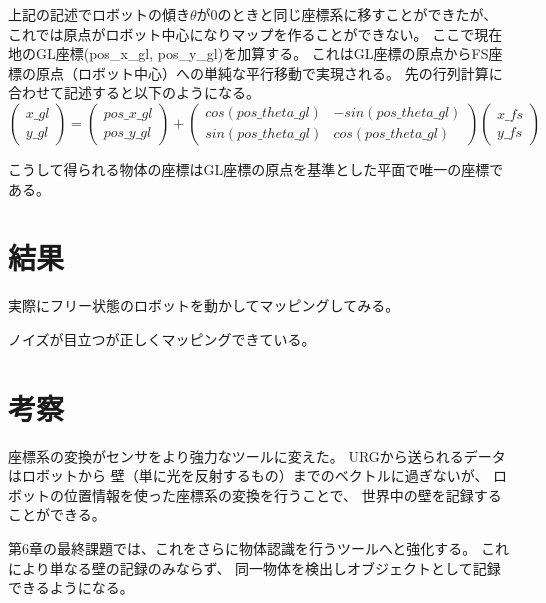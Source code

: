 \documentclass[main]{subfiles}
\begin{document}
上記の記述でロボットの傾き$\theta $が0のときと同じ座標系に移すことができたが、
これでは原点がロボット中心になりマップを作ることができない。
ここで現在地のGL座標(pos\_x\_gl, pos\_y\_gl)を加算する。
これはGL座標の原点からFS座標の原点（ロボット中心）への単純な平行移動で実現される。
先の行列計算に合わせて記述すると以下のようになる。
\[
	\left(
	\begin{array}{cc}
		x\_gl \\
		y\_gl
	\end{array}
	\right)
	=
	\left(
	\begin{array}{c}
		pos\_x\_gl \\
		pos\_y\_gl
	\end{array}
	\right)
	+
	\left(
	\begin{array}{cc}
		cos(pos\_theta\_gl) & -sin(pos\_theta\_gl) \\
		sin(pos\_theta\_gl) & cos(pos\_theta\_gl)
	\end{array}
	\right)
	\left(
	\begin{array}{c}
		x\_fs \\
		y\_fs
	\end{array}
	\right)
\]

こうして得られる物体の座標はGL座標の原点を基準とした平面で唯一の座標である。

\section{結果}
実際にフリー状態のロボットを動かしてマッピングしてみる。

ノイズが目立つが正しくマッピングできている。

\section{考察}
座標系の変換がセンサをより強力なツールに変えた。
URGから送られるデータはロボットから
壁（単に光を反射するもの）までのベクトルに過ぎないが、
ロボットの位置情報を使った座標系の変換を行うことで、
世界中の壁を記録することができる。

第6章の最終課題では、これをさらに物体認識を行うツールへと強化する。
これにより単なる壁の記録のみならず、
同一物体を検出しオブジェクトとして記録できるようになる。
\end{document}
